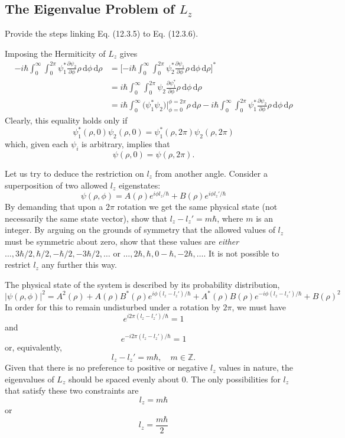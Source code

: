 \documentclass[../principles-of-quantum-mechanics.tex]{subfiles}
\begin{document}
\begin{questions}
	\subsection{The Eigenvalue Problem of $L_z$}
	\question Provide the steps linking Eq. (12.3.5) to Eq. (12.3.6).
	\begin{solution}
		Imposing the Hermiticity of $L_z$ gives
		\begin{align*}
			-i\hbar\int_0^\infty\!\!\!\int_0^{2\pi}\psi_1^*\frac{\partial\psi_2}{\partial\phi}\rho\,\mathrm{d}\phi\,\mathrm{d}\rho &= \Big[{-i\hbar}\int_0^\infty\!\!\!\int_0^{2\pi}\psi_2^*\frac{\partial\psi_1}{\partial\phi}\rho\,\mathrm{d}\phi\,\mathrm{d}\rho\Big]^* \\
			&= i\hbar\int_0^{\infty}\!\!\!\int_0^{2\pi}\psi_2\frac{\partial\psi_1^*}{\partial\phi}\rho\,\mathrm{d}\phi\,\mathrm{d}\rho \\
			&= i\hbar\int_0^\infty\big(\psi_1^*\psi_2\big)\Big|_{\phi=0}^{\phi=2\pi}\rho\,\mathrm{d}\rho - i\hbar\int_0^{\infty}\!\!\!\int_0^{2\pi}\psi_1^*\frac{\partial\psi_2}{\partial\phi}\rho\,\mathrm{d}\phi\,\mathrm{d}\rho
		\end{align*}
		Clearly, this equality holds only if
		$$\psi_1^*(\rho, 0)\psi_2(\rho, 0) = \psi_1^*(\rho, 2\pi)\psi_2(\rho, 2\pi)$$
		which, given each $\psi_i$ is arbitrary, implies that
		$$\psi(\rho, 0) = \psi(\rho, 2\pi).$$
	\end{solution}
	
	\question Let us try to deduce the restriction on $l_z$ from another angle. Consider a superposition of two allowed $l_z$ eigenstates:
	$$\psi(\rho, \phi) = A(\rho)e^{i\phi l_z/\hbar} + B(\rho)e^{i\phi l_z'/\hbar}$$
	By demanding that upon a $2\pi$ rotation we get the same physical state (not necessarily the same state vector), show that $l_z - l_z' = m\hbar$, where $m$ is an integer. By arguing on the grounds of symmetry that the allowed values of $l_z$ must be symmetric about zero, show that these values are \textit{either} $\dots, 3\hbar/2, \hbar/2, -\hbar/2, -3\hbar/2, \dots$ or $\dots, 2\hbar, \hbar, 0 -\hbar, -2\hbar, \dots$. It is not possible to restrict $l_z$ any further this way.
	\begin{solution}
		The physical state of the system is described by its probability distribution, 
		$$|\psi(\rho, \phi)|^2 = A^2(\rho) + A(\rho)B^*(\rho)e^{i\phi(l_z - l_z')/\hbar} + A^*(\rho)B(\rho)e^{-i\phi(l_z - l_z')/\hbar} + B(\rho)^2$$
		In order for this to remain undisturbed under a rotation by $2\pi$, we must have
		$$e^{i2\pi(l_z - l_z')/\hbar} = 1$$
		and
		$$e^{-i2\pi(l_z - l_z')/\hbar}=1$$
		or, equivalently,
		$$l_z - l_z' = m\hbar, \quad m\in\mathbb{Z}.$$
		Given that there is no preference to positive or negative $l_z$ values in nature, the eigenvalues of $L_z$ should be spaced evenly about $0$. The only possibilities for $l_z$ that satisfy these two constraints are
		$$l_z = m\hbar$$
		or
		$$l_z = \frac{m\hbar}{2}$$
	\end{solution}
	

\end{questions}
\end{document}
